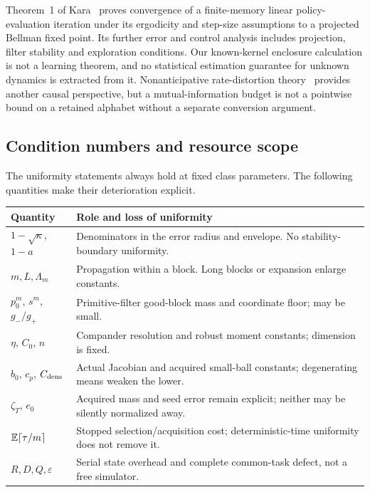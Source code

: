 Theorem~1 of Kara~\cite{kara-learning} proves convergence of a finite-memory linear policy-evaluation iteration under its ergodicity and step-size assumptions to a projected Bellman fixed point. Its further error and control analysis includes projection, filter stability and exploration conditions. Our known-kernel enclosure calculation is not a learning theorem, and no statistical estimation guarantee for unknown dynamics is extracted from it. Nonanticipative rate-distortion theory~\cite{nonanticipative} provides another causal perspective, but a mutual-information budget is not a pointwise bound on a retained alphabet without a separate conversion argument.

\subsection{Condition numbers and resource scope}
The uniformity statements always hold at fixed class parameters. The following quantities make their deterioration explicit.
\begin{center}\small
\begin{tabular}{p{}p{}}
\toprule
Quantity & Role and loss of uniformity\\\midrule
$1-\sqrt\kappa$, $1-a$ & Denominators in the error radius and envelope. No stability-boundary uniformity.\\
$m,L,\Lambda_m$ & Propagation within a block. Long blocks or expansion enlarge constants.\\
$p_0^m$, $s^m$, $g_-/g_+$ & Primitive-filter good-block mass and coordinate floor; may be small.\\
$\eta$, $C_0$, $n$ & Compander resolution and robust moment constants; dimension is fixed.\\
$b_0$, $c_p$, $C_{\rm dens}$ & Actual Jacobian and acquired small-ball constants; degenerating means weaken the lower.\\
$\zeta_T$, $e_0$ & Acquired mass and seed error remain explicit; neither may be silently normalized away.\\
$\mathbb E\lceil\tau/m\rceil$ & Stopped selection/acquisition cost; deterministic-time uniformity does not remove it.\\
$R,D,Q,\varepsilon$ & Serial state overhead and complete common-task defect, not a free simulator.\\\bottomrule
\end{tabular}\end{center}

